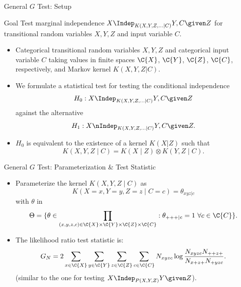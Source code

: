 
\begin{frame}{General $G$ Test: Setup}
  
  \begin{block}{Goal}
    Test marginal independence $X \Indep_{K(X,Y,Z,\dots|C)} Y, C \given Z$ for transitional random variables $X,Y,Z$ and input variable $C$.
  \end{block}
  \begin{itemize}
    \item Categorical transitional random variables $X,Y,Z$ and categorical input variable $C$ taking values in finite spaces $\C{X}$, $\C{Y}$, $\C{Z}$, $\C{C}$, respectively, and Markov kernel $K(X,Y,Z|C)$.
    \item We formulate a statistical test for testing the conditional independence
      $$H_0 : X \Indep_{K(X,Y,Z,\dots|C)} Y, C \given Z$$
      against the alternative
      $$H_1 : X \nIndep_{K(X,Y,Z,\dots|C)} Y, C \given Z.$$
    \item $H_0$ is equivalent to the existence of a kernel $K(X|Z)$ such that
      $$K(X,Y,Z \mid C) = K(X \mid Z) \otimes K(Y,Z \mid C).$$
  \end{itemize}
\end{frame}

\begin{frame}{General $G$ Test: Parameterization \& Test Statistic}
  \begin{itemize}
    \item
Parameterize the kernel $K(X,Y,Z \mid C)$ as
$$K(X=x,Y=y,Z=z \mid C=c) = \theta_{xyz|c}$$
with $\theta$ in 
$$\Theta = \{ \theta \in \prod_{(x,y,z,c) \in \C{X}\times\C{Y}\times\C{Z}\times\C{C}} : \theta_{+++|c} = 1 \ \forall c\in\C{C} \}.$$
    \item The likelihood ratio test statistic is:
\begin{equation*}
  G_N = 2 \sum_{x\in\C{X}}\sum_{y\in\C{Y}}\sum_{z\in\C{Z}}\sum_{c\in\C{C}}
  N_{xyzc} \log \frac{N_{xyzc} N_{++z+}}{N_{x+z+} N_{+yzc}}.
\end{equation*}
      (similar to the one for testing $X \Indep_{P(X,Y,Z)} Y \given Z$).
  \end{itemize}
\end{frame}

